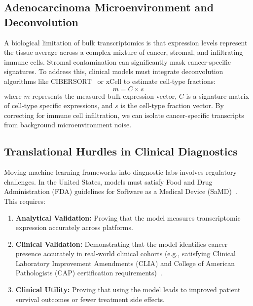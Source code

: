 \documentclass[journal,10pt]{IEEEtran}
\begin{document}
\subsection{Adenocarcinoma Microenvironment and Deconvolution}
A biological limitation of bulk transcriptomics is that expression levels represent the tissue average across a complex mixture of cancer, stromal, and infiltrating immune cells. Stromal contamination can significantly mask cancer-specific signatures. To address this, clinical models must integrate deconvolution algorithms like CIBERSORT~\cite{newman} or xCell to estimate cell-type fractions:
\begin{equation}
m = C \times s
\end{equation}
where $m$ represents the measured bulk expression vector, $C$ is a signature matrix of cell-type specific expressions, and $s$ is the cell-type fraction vector. By correcting for immune cell infiltration, we can isolate cancer-specific transcripts from background microenvironment noise.

\subsection{Translational Hurdles in Clinical Diagnostics}
Moving machine learning frameworks into diagnostic labs involves regulatory challenges. In the United States, models must satisfy Food and Drug Administration (FDA) guidelines for Software as a Medical Device (SaMD)~\cite{samd}. This requires:
\begin{enumerate}
    \item \textbf{Analytical Validation:} Proving that the model measures transcriptomic expression accurately across platforms.
    \item \textbf{Clinical Validation:} Demonstrating that the model identifies cancer presence accurately in real-world clinical cohorts (e.g., satisfying Clinical Laboratory Improvement Amendments (CLIA) and College of American Pathologists (CAP) certification requirements)~\cite{clia}.
    \item \textbf{Clinical Utility:} Proving that using the model leads to improved patient survival outcomes or fewer treatment side effects.
\end{enumerate}
\end{document}
